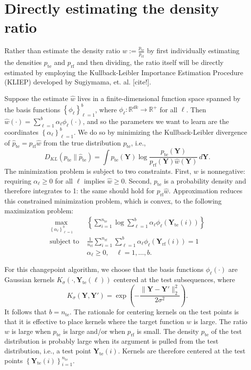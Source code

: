 \documentclass[12pt]{article}
\newcommand\prn[1]{\left( #1 \right)}
\newcommand\set[1]{\left\{ #1 \right\}}
\newcommand\RR{\mathbb{R}}
\newcommand\YY{{\boldsymbol{Y}}}
\newcommand\rf{{\mathrm{rf}}}
\newcommand\te{{\mathrm{te}}}
\begin{document}
\section{Directly estimating the density ratio}

Rather than estimate the density ratio $w:=\frac{p_\te}{p_\rf}$ by first individually estimating the densities $p_\te$ and $p_\rf$ and then dividing, the ratio itself will be directly estimated by employing the Kullback-Leibler Importance Estimation Procedure (KLIEP) developed by Sugiymama, et. al. [cite!].

Suppose the estimate $\hat w$ lives in a finite-dimensional function space spanned by the basis functions $\set{\phi_\ell}_{\ell=1}^b$,  where $\phi_\ell\colon\RR^{dk}\to\RR^+$ for all $\ell$. Then $\hat w(\cdot)=\sum_{\ell=1}^b\alpha_\ell\phi_\ell(\cdot)$, and so the parameters we want to learn are the coordinates $\set{\alpha_\ell}_{\ell=1}^b$. We do so by minimizing the Kullback-Leibler divergence of $\hat p_\te=p_\rf\hat w$ from the true distribution $p_\te$, i.e.,
$$D_{KL}(p_\te\|\hat p_\te)=\int p_\te(\YY)\log\frac{p_\te(\YY)}{p_\rf(\YY)\hat w(\YY)}\,d\YY.$$
The minimization problem is subject to two constraints. First, $w$ is nonnegative: requiring $\alpha_\ell\ge0$ for all $\ell$ implies $\hat w\ge0$. Second, $p_\te$ is a probability density and therefore integrates to 1: the same should hold for $p_\rf\hat w$. Approximation reduces this constrained minimization problem, which is convex, to the following maximization problem:
\begin{align*}
  \max_{\set{\alpha_\ell}_{\ell=1}^b}&\set{\sum_{i=1}^{n_\te}\log\sum_{\ell=1}^b\alpha_\ell\phi_\ell(\YY_\te(i))}\\
  \text{subject to }&\frac{1}{n_\rf}\sum_{i=1}^{n_\rf}\sum_{\ell=1}^b\alpha_\ell\phi_\ell(\YY_\rf(i))=1\\
  &\alpha_\ell\ge0,\quad\ell=1,\ldots,b.
\end{align*}

For this changepoint algorithm, we choose that the basis functions $\phi_\ell(\cdot)$ are Gaussian kernels $K_\sigma(\cdot,\YY_\te(\ell))$ centered at the test subsequences, where
$$K_\sigma(\YY,\YY')=\exp\prn{-\frac{\|\YY-\YY'\|_2^2}{2\sigma^2}}.$$
It follows that $b=n_\te$. The rationale for centering kernels on the test points is that it is effective to place kernels where the target function $w$ is large. The ratio $w$ is large when $p_\te$ is large and/or when $p_\rf$ is small. The density $p_\te$ of the test distribution is probably large when its argument is pulled from the test distribution, i.e., a test point $\YY_\te(i)$. Kernels are therefore centered at the test points $\set{\YY_\te(i)}_{i=1}^{n_\te}$.
\end{document}
